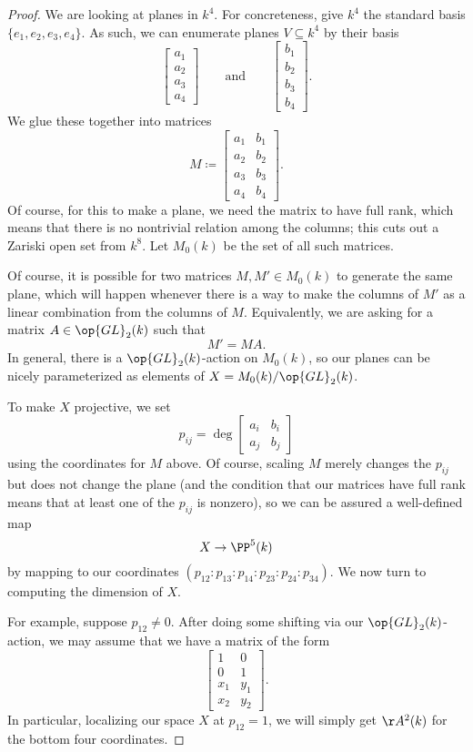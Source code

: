\begin{proof}
	We are looking at planes in $k^4$. For concreteness, give $k^4$ the standard basis $\{e_1,e_2,e_3,e_4\}$. As such, we can enumerate planes $V\subseteq k^4$ by their basis
	\[\begin{bmatrix}
		a_1 \\
		a_2 \\
		a_3 \\
		a_4
	\end{bmatrix}\qquad\text{and}\qquad\begin{bmatrix}
		b_1 \\
		b_2 \\
		b_3 \\
		b_4
	\end{bmatrix}.\]
	We glue these together into matrices
	\[M\coloneqq\begin{bmatrix}
		a_1 & b_1 \\
		a_2 & b_2 \\
		a_3 & b_3 \\
		a_4 & b_4
	\end{bmatrix}.\]
	Of course, for this to make a plane, we need the matrix to have full rank, which means that there is no nontrivial relation among the columns; this cuts out a Zariski open set from $k^8$. Let $M_0(k)$ be the set of all such matrices.

	Of course, it is possible for two matrices $M,M'\in M_0(k)$ to generate the same plane, which will happen whenever there is a way to make the columns of $M'$ as a linear combination from the columns of $M$. Equivalently, we are asking for a matrix $A\in\op{GL}_2(k)$ such that
	\[M'=MA.\]
	In general, there is a $\op{GL}_2(k)$-action on $M_0(k)$, so our planes can be nicely parameterized as elements of $X=M_0(k)/\op{GL}_2(k)$.

	To make $X$ projective, we set
	\[p_{ij}=\deg\begin{bmatrix}
		a_i & b_i \\
		a_j & b_j
	\end{bmatrix}\]
	using the coordinates for $M$ above. Of course, scaling $M$ merely changes the $p_{ij}$ but does not change the plane (and the condition that our matrices have full rank means that at least one of the $p_{ij}$ is nonzero), so we can be assured a well-defined map
	\[X\to\PP^5(k)\]
	by mapping to our coordinates $(p_{12}:p_{13}:p_{14}:p_{23}:p_{24}:p_{34})$. We now turn to computing the dimension of $X$.

	For example, suppose $p_{12}\ne0$. After doing some shifting via our $\op{GL}_2(k)$-action, we may assume that we have a matrix of the form
	\[\begin{bmatrix}
		1 & 0 \\
		0 & 1 \\
		x_1 & y_1 \\
		x_2 & y_2
	\end{bmatrix}.\]
	In particular, localizing our space $X$ at $p_{12}=1$, we will simply get $\AA^2(k)$ for the bottom four coordinates.
	

\end{proof}
